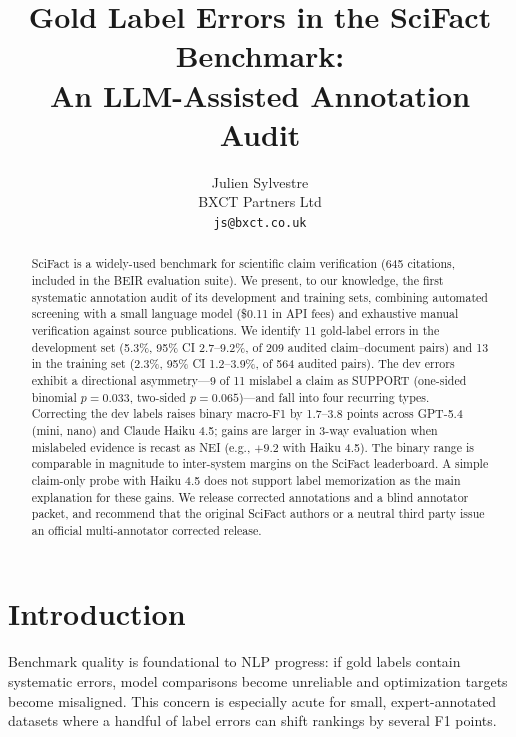 \documentclass[11pt]{article}
\title{Gold Label Errors in the SciFact Benchmark:\\An LLM-Assisted Annotation Audit}
\author{Julien Sylvestre \\
  BXCT Partners Ltd \\
  \texttt{js@bxct.co.uk}}
\begin{document}
\maketitle

\begin{abstract}
SciFact is a widely-used benchmark for scientific claim verification (645 citations, included in the BEIR evaluation suite).
We present, to our knowledge, the first systematic annotation audit of its development and training sets, combining automated screening with a small language model (\$0.11 in API fees) and exhaustive manual verification against source publications.
We identify 11 gold-label errors in the development set (5.3\%, 95\% CI 2.7--9.2\%, of 209 audited claim--document pairs) and 13 in the training set (2.3\%, 95\% CI 1.2--3.9\%, of 564 audited pairs).
The dev errors exhibit a directional asymmetry---9 of 11 mislabel a claim as SUPPORT (one-sided binomial $p{=}0.033$, two-sided $p{=}0.065$)---and fall into four recurring types.
Correcting the dev labels raises binary macro-F1 by 1.7--3.8 points across GPT-5.4 (mini, nano) and Claude Haiku 4.5; gains are larger in 3-way evaluation when mislabeled evidence is recast as NEI (e.g., $+9.2$ with Haiku 4.5).
The binary range is comparable in magnitude to inter-system margins on the SciFact leaderboard.
A simple claim-only probe with Haiku 4.5 does not support label memorization as the main explanation for these gains.
We release corrected annotations and a blind annotator packet, and recommend that the original SciFact authors or a neutral third party issue an official multi-annotator corrected release.
\end{abstract}

\section{Introduction}

Benchmark quality is foundational to NLP progress: if gold labels contain systematic errors, model comparisons become unreliable and optimization targets become misaligned.
This concern is especially acute for small, expert-annotated datasets where a handful of label errors can shift rankings by several F1 points.
\end{document}
